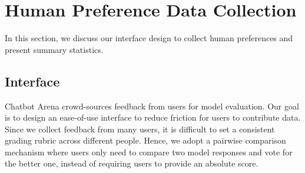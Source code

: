 \documentclass{article}
\newcommand{\system}{Chatbot Arena\xspace}
\begin{document}
\printAffiliationsAndNotice{\icmlEqualContribution}


\begin{abstract}
Large Language Models (LLMs) have unlocked new capabilities and applications; however, evaluating the alignment with human preferences still poses significant challenges.
To address this issue, we introduce \system, an open platform for evaluating LLMs based on human preferences. Our methodology employs a pairwise comparison approach and leverages input from a diverse user base through crowdsourcing. The platform has been operational for several months, amassing over 240K votes. This paper describes the platform, analyzes the data we have collected so far, and explains the tried-and-true statistical methods we are using for efficient and accurate evaluation and ranking of models. We confirm that the crowdsourced questions are sufficiently diverse and discriminating and that the crowdsourced human votes are in good agreement with those of expert raters. These analyses collectively establish a robust foundation for the credibility of \system.
Because of its unique value and openness, \system has emerged as one of the most referenced LLM leaderboards, widely cited by leading LLM developers and companies. Our demo is publicly available at \url{https://chat.lmsys.org}.
\end{abstract}





\section{Human Preference Data Collection}

In this section, we discuss our interface design to collect human preferences and present summary statistics.
\subsection{Interface}

\system crowd-sources feedback from users for model evaluation. Our goal is to design an ease-of-use interface to reduce friction for users to contribute data.
Since we collect feedback from many users, it is difficult to set a consistent grading rubric across different people. Hence, we adopt a pairwise comparison mechanism where users only need to compare two model responses and vote for the better one, instead of requiring users to provide an absolute score.
\end{document}
